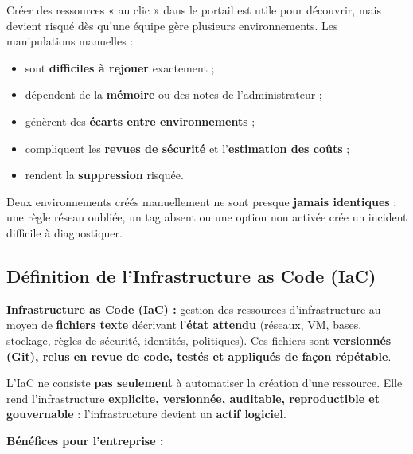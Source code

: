\documentclass[11pt,a4paper]{article}
\begin{document}
Créer des ressources « au clic » dans le portail est utile pour découvrir, mais devient risqué dès qu'une équipe gère plusieurs environnements. Les manipulations manuelles :
\begin{itemize}
\item sont \textbf{difficiles à rejouer} exactement ;
\item dépendent de la \textbf{mémoire} ou des notes de l'administrateur ;
\item génèrent des \textbf{écarts entre environnements} ;
\item compliquent les \textbf{revues de sécurité} et l'\textbf{estimation des coûts} ;
\item rendent la \textbf{suppression} risquée.
\end{itemize}

\begin{notebox}
Deux environnements créés manuellement ne sont presque \textbf{jamais identiques} : une règle réseau oubliée, un tag absent ou une option non activée crée un incident difficile à diagnostiquer.
\end{notebox}

\subsection{Définition de l'Infrastructure as Code (IaC)}

\begin{defbox}
\textbf{Infrastructure as Code (IaC) :} gestion des ressources d'infrastructure au moyen de \textbf{fichiers texte} décrivant l'\textbf{état attendu} (réseaux, VM, bases, stockage, règles de sécurité, identités, politiques). Ces fichiers sont \textbf{versionnés (Git), relus en revue de code, testés et appliqués de façon répétable}.
\end{defbox}

\begin{keybox}
L'IaC ne consiste \textbf{pas seulement} à automatiser la création d'une ressource. Elle rend l'infrastructure \textbf{explicite, versionnée, auditable, reproductible et gouvernable} : l'infrastructure devient un \textbf{actif logiciel}.
\end{keybox}

\textbf{Bénéfices pour l'entreprise :}
\end{document}
